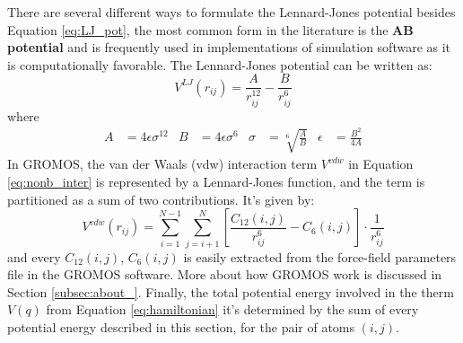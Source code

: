 There are several different ways to formulate the Lennard-Jones potential besides Equation \ref{eq:LJ_pot}, the most common form in the literature is the \textbf{AB potential} and is frequently used in implementations of simulation software as it is computationally favorable. The Lennard-Jones potential can be written as:
\begin{equation}
    V^{LJ}(r_{ij})=\frac{A}{r_{ij}^{12}}-\frac{B}{r_{ij}^{6}} 
    \label{eq:AB_LJ_pot}
\end{equation}
where 
\begin{align*}
    A&=4\epsilon\sigma^{12} & B&=4\epsilon\sigma^{6} & \sigma&=\sqrt[6]{\frac{A}{B}} & \epsilon&=\frac{B^{2}}{4A}
\end{align*}
In GROMOS, the van der Waals (vdw) interaction term $V^{vdw}$ in Equation \ref{eq:nonb_inter} is represented by a Lennard-Jones function, and the term is partitioned as a sum of two contributions. It's given by:
\begin{equation}
    V^{vdw}(r_{ij})=\sum_{i=1}^{N-1}\sum_{j=i+1}^{N} \left [  \frac{C_{12}(i,j)}{r_{ij}^6}-C_{6}(i,j) \right ]\cdot \frac{1}{r_{ij}^6}
    \label{eq:gromos_LJ}
\end{equation}
and every $C_{12}(i,j)$, $C_{6}(i,j)$ is easily extracted from the force-field parameters file in the GROMOS software. More about how GROMOS work is discussed in Section \ref{subsec:about_}. Finally, the total potential energy involved in the therm $V(q)$ from Equation \ref{eq:hamiltonian} it's determined by the sum of every potential energy described in this section, for the pair of atoms $(i,j)$.


